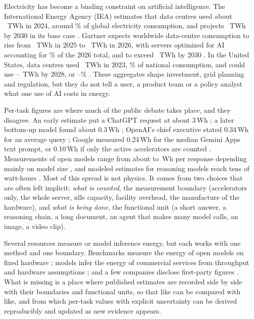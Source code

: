 \documentclass[11pt]{article}
\newcommand{\Wh}{\,Wh}
\begin{document}
Electricity has become a binding constraint on artificial intelligence. The International Energy Agency (IEA) estimates that data centres used about \ieaTwhA~TWh in 2024, around \ieaShare\% of global electricity consumption, and projects \ieaTwhB~TWh by 2030 in its base case \citep{iea2025energyai}. Gartner expects worldwide data-centre consumption to rise from \gartnerTwhA~TWh in 2025 to \gartnerTwhB~TWh in 2026, with servers optimized for AI accounting for \gartnerAIShare\% of the 2026 total, and to exceed \gartnerTwhC~TWh by 2030 \citep{gartner2026dc}. In the United States, data centres used \lbnlTwh~TWh in 2023, \lbnlShare\% of national consumption, and could use \lbnlTwhLo--\lbnlTwhHi~TWh by 2028, or \lbnlShareLo--\lbnlShareHi\% \citep{shehabi2024lbnl}. These aggregates shape investment, grid planning and regulation, but they do not tell a user, a product team or a policy analyst what one use of AI costs in energy.

Per-task figures are where much of the public debate takes place, and they disagree. An early estimate put a ChatGPT request at about 3\Wh{} \citep{devries2023growing}; a later bottom-up model found about 0.3\Wh{} \citep{you2025chatgpt}; OpenAI's chief executive stated 0.34\Wh{} for an average query \citep{altman2025gentle}; Google measured 0.24\Wh{} for the median Gemini Apps text prompt, or 0.10\Wh{} if only the active accelerators are counted \citep{elsworth2025measuring}. Measurements of open models range from about \mitLo{} to \mitHi\Wh{} per response depending mainly on model size \citep{odonnell2025math}, and modeled estimates for reasoning models reach tens of watt-hours \citep{jegham2025hungry}. Most of this spread is not physics. It comes from two choices that are often left implicit: \emph{what is counted}, the measurement boundary (accelerators only, the whole server, idle capacity, facility overhead, the manufacture of the hardware), and \emph{what is being done}, the functional unit (a short answer, a reasoning chain, a long document, an agent that makes many model calls, an image, a video clip).

Several resources measure or model inference energy, but each works with one method and one boundary. Benchmarks measure the energy of open models on fixed hardware \citep{luccioni2024power,chung2025mlenergy,aienergyscore2025}; models infer the energy of commercial services from throughput and hardware assumptions \citep{jegham2025hungry,oviedo2026energy,rince2025ecologits}; and a few companies disclose first-party figures \citep{elsworth2025measuring,altman2025gentle,mistral2025lca}. What is missing is a place where published estimates are recorded side by side with their boundaries and functional units, so that like can be compared with like, and from which per-task values with explicit uncertainty can be derived reproducibly and updated as new evidence appears.
\end{document}
